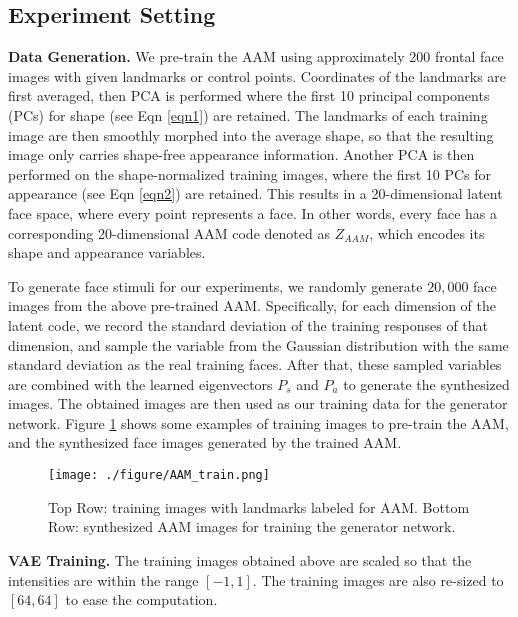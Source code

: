 \documentclass{article}
\begin{document}
\subsection{Experiment Setting}
\noindent \textbf{Data Generation.} We pre-train the AAM using approximately 200 frontal face images with given landmarks or control points. Coordinates of the landmarks are first averaged, then PCA is performed where the first 10 principal components (PCs) for shape (see Eqn \ref{eqn1}) are retained. The landmarks of each training image are then smoothly morphed into the average shape, so that the resulting image only carries shape-free appearance information. Another PCA is then performed on the shape-normalized training images, where the first 10 PCs for appearance (see Eqn \ref{eqn2}) are retained. This results in a 20-dimensional latent face space, where every point represents a face. In other words, every face has a corresponding 20-dimensional AAM code denoted as $Z_{AAM}$, which encodes its shape and appearance variables. 

To generate face stimuli for our experiments, we randomly generate $20,000$ face images from the above pre-trained AAM. Specifically, for each dimension of the latent code, we record the standard deviation of the training responses of that dimension, and sample the variable from the Gaussian distribution with the same standard deviation as the real training faces. After that, these sampled variables are combined with the learned eigenvectors $P_s$ and $P_a$ to generate the synthesized images. The obtained images are then used as our training data for the generator network. Figure \ref{fig:AAM_train} shows some examples of training images to pre-train the AAM, and the synthesized face images generated by the trained AAM. 

\begin{figure}[h]
	\begin{center}
		\texttt{[image: ./figure/AAM\_train.png]}\hspace{0.5mm}			
		\caption{Top Row: training images with landmarks labeled for AAM. Bottom Row: synthesized AAM images for training the generator network.}
		\label{fig:AAM_train}
	\end{center}
	
\end{figure}

\noindent \textbf{VAE Training.} The training images obtained above are scaled so that the intensities are within the range $[-1,1]$. The training images are also re-sized to $[64, 64]$ to ease the computation. 
\end{document}
